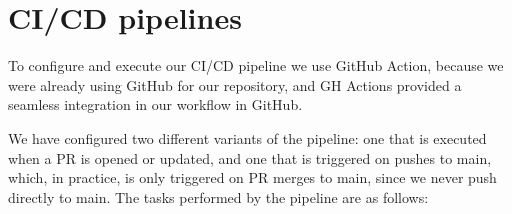 \section{CI/CD pipelines}
To configure and execute our CI/CD pipeline we use GitHub Action, because we were already using GitHub for our repository, and GH Actions provided a seamless integration in our workflow in GitHub. %

We have configured two different variants of the pipeline: one that is executed when a PR is opened or updated, and one that is triggered on pushes to main, which, in practice, is only triggered on PR merges to main, since we never push directly to main. The tasks performed by the pipeline are as follows:

